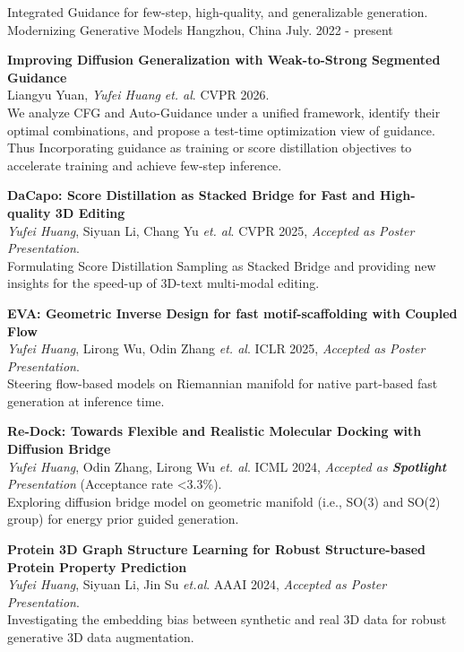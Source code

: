 \begin{cventries}
  \cventry
    {Integrated Guidance for few-step, high-quality, and generalizable generation.} %
    {Modernizing Generative Models} %
    {Hangzhou, China} %
    {July. 2022 - present} %
    {
      \begin{cvitems} %
        \item {
        \textbf{Improving Diffusion Generalization with Weak-to-Strong Segmented Guidance} \\
        Liangyu Yuan, \textit{Yufei Huang} \textit{et. al}.  \space \space CVPR 2026.\\
        We analyze CFG and Auto-Guidance under a unified framework, identify their optimal combinations, and propose a test-time optimization view of guidance. Thus Incorporating guidance as training or score distillation objectives to accelerate training and achieve few-step inference.
        }
        \item {
        \textbf{DaCapo: Score Distillation as Stacked Bridge for Fast and High-quality 3D Editing} \\
        \textit{Yufei Huang}, Siyuan Li, Chang Yu \textit{et. al}.  \space \space \space CVPR 2025, \space \space \textit{Accepted as Poster Presentation}.\\
        Formulating Score Distillation Sampling as Stacked Bridge and providing new insights for the speed-up of 3D-text multi-modal editing.
        }
        \item{
        \textbf{EVA: Geometric Inverse Design for fast motif-scaffolding with Coupled Flow} \\
        \textit{Yufei Huang}, Lirong Wu, Odin Zhang \textit{et. al}.  \space \space \space ICLR 2025, \space \space \textit{Accepted as Poster Presentation}.\\
        Steering flow-based models on Riemannian manifold for native part-based fast generation at inference time.
        }
        \item {
        \textbf{Re-Dock: Towards Flexible and Realistic Molecular Docking with Diffusion Bridge}\\
        \textit{Yufei Huang}, Odin Zhang, Lirong Wu \textit{et. al}. \space \space \space ICML 2024, \space \space \textit{Accepted as \textbf{Spotlight} Presentation} (Acceptance rate \textless 3.3\%).\\
        Exploring diffusion bridge model on geometric manifold (i.e., SO(3) and SO(2) group) for energy prior guided generation.
        }
        \item {
        \textbf{Protein 3D Graph Structure Learning for Robust Structure-based Protein Property Prediction}\\
        \textit{Yufei Huang}, Siyuan Li, Jin Su \textit{et.al}.  \space \space \space AAAI 2024, \space \space \textit{Accepted as Poster Presentation}.\\
        Investigating the embedding bias between synthetic and real 3D data for robust generative 3D data augmentation.
        }
      \end{cvitems}
    }
\end{cventries}
